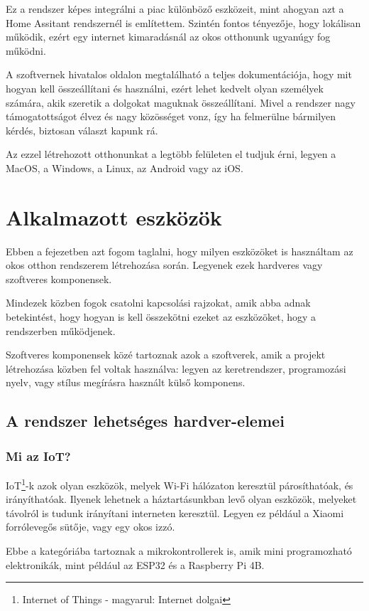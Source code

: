 \documentclass[
]{thesis-ekf}
\theoremstyle{definition}
\theoremstyle{remark}
\begin{document}
	Ez a rendszer képes integrálni a piac különböző eszközeit, mint ahogyan azt a Home Assitant rendszernél is említettem. Szintén fontos tényezője, hogy lokálisan működik, ezért egy internet kimaradásnál az okos otthonunk ugyanúgy fog működni. 
	
	A szoftvernek hivatalos oldalon megtalálható a teljes dokumentációja, hogy mit hogyan kell összeállítani és használni, ezért lehet kedvelt olyan személyek számára, akik szeretik a dolgokat maguknak összeállítani. Mivel a rendszer nagy támogatottságot élvez és nagy közösséget vonz, így ha felmerülne bármilyen kérdés, biztosan választ kapunk rá.
	
	Az ezzel létrehozott otthonunkat a legtöbb felületen el tudjuk érni, legyen a MacOS,  a Windows, a Linux, az Android vagy az iOS.\cite{openhab}
	
	\chapter{Alkalmazott eszközök}
	
	Ebben a fejezetben azt fogom taglalni, hogy milyen eszközöket is használtam az okos otthon rendszerem létrehozása során. Legyenek ezek hardveres vagy szoftveres komponensek. 
	
	Mindezek közben fogok csatolni kapcsolási rajzokat, amik abba adnak betekintést, hogy hogyan is kell összekötni ezeket az eszközöket, hogy a rendszerben működjenek.
	
	Szoftveres komponensek közé tartoznak azok a szoftverek, amik a projekt létrehozása közben fel voltak használva: legyen az keretrendszer, programozási nyelv, vagy stílus megírásra használt külső komponens.
	
	\section{A rendszer lehetséges hardver-elemei}\label{hardware-sec}
	\subsection{Mi az IoT?}
	IoT\footnote{Internet of Things - magyarul: Internet dolgai}-k azok olyan eszközök, melyek Wi-Fi hálózaton keresztül párosíthatóak, és irányíthatóak. Ilyenek lehetnek a háztartásunkban levő olyan eszközök, melyeket távolról is tudunk irányítani interneten keresztül. Legyen ez például a Xiaomi forrólevegős sütője, vagy egy okos izzó. 
	
	Ebbe a kategóriába tartoznak a mikrokontrollerek is, amik mini programozható elektronikák, mint például az ESP32 és a Raspberry Pi 4B.
	
\end{document}
